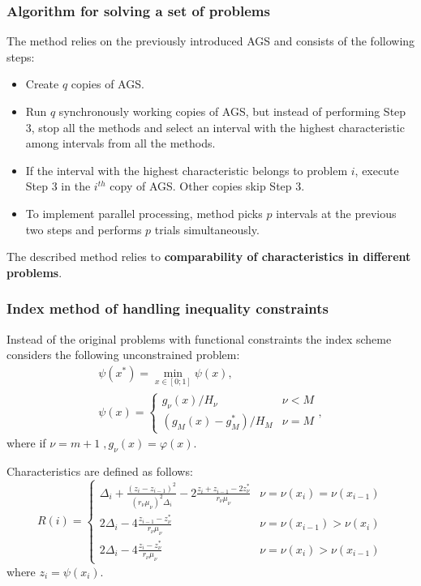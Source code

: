 \documentclass[aspectratio=1610]{beamer}
\begin{document}
\begin{frame}
  \frametitle{Algorithm for solving a set of problems}
  The method relies on the previously introduced AGS and consists of the following steps:
  \begin{itemize}
    \item Create \(q\) copies of AGS.
    \item Run \(q\) synchronously working copies of AGS, but instead of performing Step 3, stop all
    the methods and select an interval with the highest characteristic among intervals from all the methods.
    \item If the interval with the highest characteristic belongs to problem \(i\), execute Step 3 in the \(i^{th}\) copy of AGS.
    Other copies skip Step 3.
    \item To implement parallel processing, method picks \(p\) intervals at the previous two steps
    and performs \(p\) trials simultaneously.
  \end{itemize}
  The described method relies to \textbf{comparability of characteristics in different problems}.
\end{frame}

\begin{frame}
  \frametitle{Index method of handling inequality constraints}
  Instead of the original problems with functional constraints the index scheme considers the following unconstrained problem:
  \begin{displaymath}
    \begin{array}{lr}
      \psi (x^{*})=\min_{x\in [0;1]}\psi (x), \\
      \psi (x)={\begin{cases}g_{\nu }(x)/H_{\nu }&\nu <M\\(g_{M}(x)-g_{M}^{*})/H_{M}&\nu =M\end{cases}},
    \end{array}
  \end{displaymath}
  where if \(\nu=m+1\;,g_\nu(x)=\varphi(x)\).

  Characteristics are defined as follows:
  \begin{displaymath}
    R(i)={\begin{cases}\Delta _{i}+{\frac {(z_{i}-z_{i-1})^{2}}{(r_{\nu }\mu _{\nu })^{2}\Delta _{i}}}-2{\frac {z_{i}+z_{i-1}-2z_{\nu }^{*}}{r_{\nu }\mu _{\nu }}}&\nu =\nu (x_{i})=\nu (x_{i-1})\\2\Delta _{i}-4{\frac {z_{i-1}-z_{\nu }^{*}}{r_{\nu }\mu _{\nu }}}&\nu =\nu (x_{i-1})>\nu (x_{i})\\2\Delta _{i}-4{\frac {z_{i}-z_{\nu }^{*}}{r_{\nu }\mu _{\nu }}}&\nu =\nu (x_{i})>\nu (x_{i-1})\end{cases}}
  \end{displaymath}
  where \(z_i=\psi(x_i)\).
\end{frame}
\end{document}
